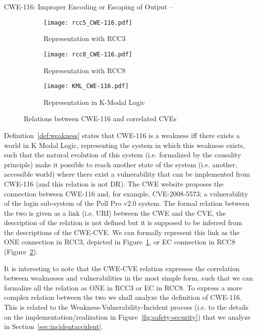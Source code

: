 \begin{example}{CWE-116: Improper Encoding or Escaping of Output\autocite{CWE-116} --}
\begin{figure}[t]
	\centering
	\begin{subfigure}[b]{.5\textwidth}
		\centering
		\texttt{[image: rcc5\_CWE-116.pdf]}
		\caption{Representation with RCC3}
		\label{fig:rcc5_CWE-116}
	\end{subfigure}\begin{subfigure}[b]{.5\textwidth}
		\centering
		\texttt{[image: rcc8\_CWE-116.pdf]}
		\caption{Representation with RCC8}
		\label{fig:rcc8_CWE-116}
	\end{subfigure}
	\begin{subfigure}[b]{\textwidth}
		\centering
		\texttt{[image: KML\_CWE-116.pdf]}
		\caption{Representation in K-Modal Logic}
		\label{fig:KML_CWE-116}
	\end{subfigure}
	\caption{Relations between CWE-116 and correlated CVEs}
\end{figure}
Definition~\ref{def:weakness} states that CWE-116 is a weakness iff there exists a world in
K Modal Logic, representing the system in which this weakness exists, 
such that the natural evolution of this system (i.e. formalized by the causality principle) 
make it possible to reach another state of the system (i.e. another, accessible world)
where there exist a vulnerability that can be implemented from CWE-116 (and this relation 
is not DR). The CWE website proposes the connection between CWE-116 and, for example, 
CVE-2008-5573; a vulnerability of the login sub-system 
of the Poll Pro v2.0\autocite{pollpro} system.
The formal relation between the two is given as a link (i.e. URI) between the CWE and
the CVE, the description of the relation is not defined but it is supposed to be
inferred from the descriptions of the CWE-CVE. 
We can formally represent this link as the ONE connection in RCC3, depicted in 
Figure~\ref{fig:rcc5_CWE-116}, or EC connection in RCC8 (Figure~\ref{fig:rcc8_CWE-116}).
\end{example}

It is interesting to note that the CWE-CVE relation expresses the correlation
between weaknesses and vulnerabilities in the most simple form, such that we
can formalize all the relation as ONE in RCC3 or EC in RCC8.  To express a more
complex relation between the two we shall analyze the definition of CWE-116.
This is related to the Weakness-Vulnerability-Incident process (i.e. to the
details on the implementation/realization in Figure~\ref{fig:safety-security})
that we analyze in Section~\ref{sec:incidentaccident}.

